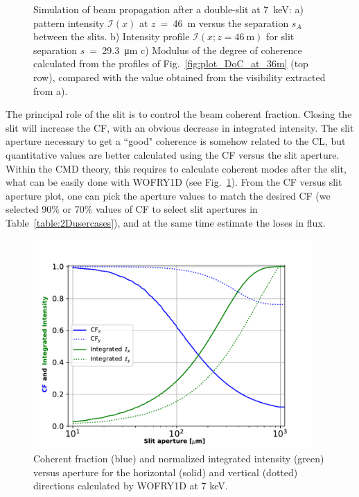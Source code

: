 \documentclass{iucr}              %
\begin{document}
\begin{figure}
    \caption{Simulation of beam propagation after a double-slit at 7~keV:  a) pattern intensity $\mathcal{I}(x)$ at $z$~=~\SI{46}{\meter} versus the separation $s_A$ between the slits. b) Intensity profile $\mathcal{I}(x;z=46~\text{m})$ for slit separation $s$~=~\SI{29.3}{\micro\meter} c) Modulus of the degree of coherence calculated from the profiles of Fig.~\ref{fig:plot_DoC_at_36m} (top row), compared with the value obtained from the visibility extracted from a). 
    }
\end{figure}


The principal role of the slit is to control the beam coherent fraction. Closing the slit will increase the CF, with an obvious decrease in integrated intensity. The slit aperture necessary to get a ``good" coherence is somehow related to the CL, but quantitative values are better calculated using the CF versus the slit aperture. Within the CMD theory, this requires to calculate coherent modes after the slit, what can be easily done with WOFRY1D (see Fig.~\ref{fig:CFvsGap}). From the CF versus slit aperture plot, one can pick the aperture values to match the desired CF (we selected 90\% or 70\% values of CF to select slit apertures in Table~\ref{table:2Dusercases}), and at the same time estimate the loses in flux.

\begin{figure}
    \label{fig:CFvsGap}
    \includegraphics[width=0.95\textwidth]{figures/CFvsGap.pdf}
    \caption{Coherent fraction (blue) and normalized integrated intensity (green) versus aperture for the horizontal (solid) and vertical (dotted) directions calculated by WOFRY1D at 7 keV.
    }
\end{figure}
\end{document}
